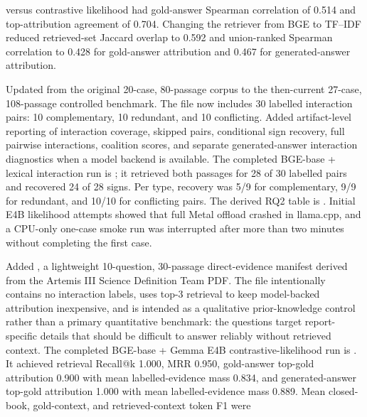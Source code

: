 \begin{description}
  versus contrastive likelihood had gold-answer Spearman correlation of 0.514
  and top-attribution agreement of 0.704. Changing the retriever from BGE to
  TF--IDF reduced retrieved-set Jaccard overlap to 0.592 and union-ranked
  Spearman correlation to 0.428 for gold-answer attribution and 0.467 for
  generated-answer attribution.
  \item[2026-06-16, interaction-aware controlled benchmark] Updated
   from the original 20-case,
  80-passage corpus to the then-current 27-case, 108-passage controlled benchmark.
  The file now includes 30 labelled interaction pairs: 10 complementary, 10
  redundant, and 10 conflicting. Added artifact-level reporting of interaction
  coverage, skipped
  pairs, conditional sign recovery, full pairwise interactions, coalition
  scores, and separate generated-answer interaction diagnostics when a model
  backend is available. The completed BGE-base + lexical interaction run is
  ; it
  retrieved both passages for 28 of 30 labelled pairs and recovered 24 of 28
  signs. Per type, recovery was 5/9 for complementary, 9/9 for redundant, and
  10/10 for conflicting pairs. The derived RQ2 table is
  .
  Initial E4B likelihood attempts showed that full Metal offload crashed in
  llama.cpp, and a CPU-only one-case smoke run was interrupted after more than
  two minutes without completing the first case.
  \item[2026-06-17, Artemis prior-knowledge control] Added
  , a lightweight
  10-question, 30-passage direct-evidence manifest derived from the Artemis III
  Science Definition Team PDF. The file intentionally contains no interaction
  labels, uses top-3 retrieval to keep model-backed attribution inexpensive, and
  is intended as a qualitative prior-knowledge control rather than a primary
  quantitative benchmark: the questions target report-specific details that
  should be difficult to answer reliably without retrieved context. The
  completed BGE-base + Gemma E4B contrastive-likelihood run is
  . It
  achieved retrieval Recall@k 1.000, MRR 0.950, gold-answer top-gold
  attribution 0.900 with mean labelled-evidence mass 0.834, and
  generated-answer top-gold attribution 1.000 with mean labelled-evidence mass
  0.889. Mean closed-book, gold-context, and retrieved-context token F1 were

\end{description}
